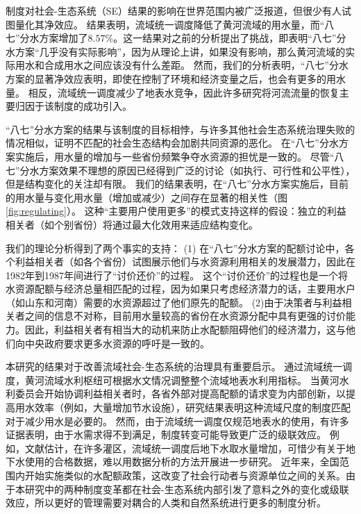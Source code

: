 制度对社会-生态系统（SE）结果的影响在世界范围内被广泛报道，但很少有人试图量化其净效应\cite{cumming2020a}。
结果表明，流域统一调度降低了黄河流域的用水量，而“八七”分水方案增加了$8.57\%$。这一结果对之前的分析提出了挑战，即表明“八七”分水方案“几乎没有实际影响”，因为从理论上讲，如果没有影响，那么黄河流域的实际用水和合成用水之间应该没有什么差距\cite{abadie2015,hill2021}。
然而，我们的分析表明，“八七”分水方案的显著净效应表明，即使在控制了环境和经济变量之后，也会有更多的用水量。
相反，流域统一调度减少了地表水竞争，因此许多研究将河流流量的恢复主要归因于该制度的成功引入\cite{chen2021,huangang2002,an2007}。

%
“八七”分水方案的结果与该制度的目标相悖，与许多其他社会生态系统治理失败的情况相似，证明不匹配的社会生态结构会加剧共同资源的恶化\cite{kellenberg2009,cai2016,barnes2019}。
在“八七”分水方案实施后，用水量的增加与一些省份频繁争夺水资源的担忧是一致的。
尽管“八七”分水方案效果不理想的原因已经得到广泛的讨论（如执行、可行性和公平性），但是结构变化的关注却有限。
我们的结果表明，在“八七”分水方案实施后，目前的用水量与变化用水量（增加或减少）之间存在显著的相关性（图\ref{fig:regulating}）。
这种“主要用户使用更多”的模式支持这样的假设：独立的利益相关者（如个别省份）将通过最大化效用来适应结构变化。

我们的理论分析得到了两个事实的支持：
(1) 在“八七”分水方案的配额讨论中，各个利益相关者（如各个省份）试图展示他们与水资源利用相关的发展潜力，因此在1982年到1987年间进行了“讨价还价”的过程\cite{wang2019a, wang2019d}。
这个“讨价还价”的过程也是一个将水资源配额与经济总量相匹配的过程，因为如果只考虑经济潜力的话，主要用水户（如山东和河南）需要的水资源超过了他们原先的配额\cite{zuo2020}。
(2)由于决策者与利益相关者之间的信息不对称，目前用水量较高的省份在水资源分配中具有更强的讨价能力。因此，利益相关者有相当大的动机来防止水配额阻碍他们的经济潜力，这与他们向中央政府要求更多水资源的呼吁是一致的\cite{wang2019a, wang2019d}。

本研究的结果对于改善流域社会-生态系统的治理具有重要启示。
通过流域统一调度，黄河流域水利枢纽可根据水文情况调整整个流域地表水利用指标。
当黄河水利委员会开始协调利益相关者时，各省外部对提高配额的请求变为内部创新，以提高用水效率（例如，大量增加节水设施）\cite{krieger1955, ostrom1990}，研究结果表明这种流域尺度的制度匹配对于减少用水是必要的。
然而，由于流域统一调度仅规范地表水的使用，有许多证据表明，由于水需求得不到满足，制度转变可能导致更广泛的级联效应。
例如，文献估计，在许多灌区，流域统一调度后地下水取水量增加，可惜少有关于地下水使用的合格数据，难以用数据分析的方法开展进一步研究\cite{sun2022b}。
近年来，全国范围内开始实施类似的水配额政策，这改变了社会行动者与资源单位之间的关系。由于本研究中的两种制度变革都在社会-生态系统内部引发了意料之外的变化或级联效应，所以更好的管理需要对耦合的人类和自然系统进行更多的制度分析。

